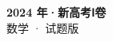 \documentclass[zihao=-4, a4paper]{ctexart}
\begin{document}
\begin{center}
  {\Large\bfseries 2024 年·新高考Ⅰ卷}\\[4pt]
  {\large 数学 · 试题版}
\end{center}
\medskip
{}

\end{document}
